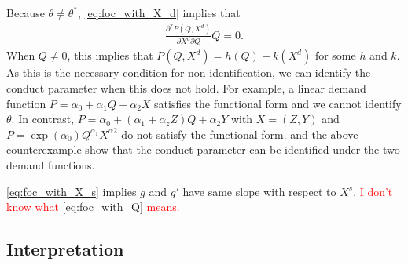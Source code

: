 \documentclass[11pt, a4paper]{article}
\theoremstyle{remark}
\begin{document}
Because $\theta \ne \theta^{*}$, \eqref{eq:foc_with_X_d} implies that 
\begin{align}
    \frac{\partial^2 P(Q,X^{d})}{\partial X^{d}\partial Q}Q = 0.
\end{align}
When $Q\ne 0$, this implies that $P(Q, X^{d}) = h(Q) + k(X^{d})$ for some $h$ and $k$. 
As this is the necessary condition for non-identification, we can identify the conduct parameter when this does not hold.
For example, a linear demand function $P = \alpha_0 + \alpha_1 Q + \alpha_2 X$ satisfies the functional form and we cannot identify $\theta$.
In contrast, $P = \alpha_0 + (\alpha_1 +\alpha_z Z) Q + \alpha_2 Y$ with $X = (Z,Y)$ and $P = \exp(\alpha_0)Q^{\alpha_1}X^{\alpha2}$ do not satisfy the functional form.
\citet{bresnahan1982oligopoly} and the above counterexample show that the conduct parameter can be identified under the two demand functions.

\eqref{eq:foc_with_X_s} implies $g$ and $g'$ have same slope with respect to $X^{s}$.
\textcolor{red}{I don't know what \eqref{eq:foc_with_Q} means.}





\subsection{Interpretation}
\end{document}
